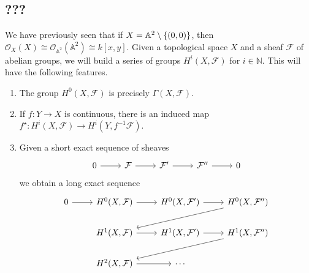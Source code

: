 \subsection{???}
We have previously seen that if \( X = \mathbb A^2 \setminus \qty{(0, 0)} \), then \( \mathcal O_X(X) \cong \mathcal O_{\mathbb A^2}(\mathbb A^2) \cong k[x, y] \).
Given a topological space \( X \) and a sheaf \( \mathcal F \) of abelian groups, we will build a series of groups \( H^i(X, \mathcal F) \) for \( i \in \mathbb N \).
This will have the following features.
\begin{enumerate}
    \item The group \( H^0(X, \mathcal F) \) is precisely \( \Gamma(X, \mathcal F) \).
    \item If \( f : Y \to X \) is continuous, there is an induced map \( f^\star : H^i(X, \mathcal F) \to H^i(Y, f^{-1} \mathcal F) \).
    \item Given a short exact sequence of sheaves
\[\begin{tikzcd}
	0 & {\mathcal F} & {\mathcal F'} & {\mathcal F''} & 0
	\arrow[from=1-1, to=1-2]
	\arrow[from=1-2, to=1-3]
	\arrow[from=1-3, to=1-4]
	\arrow[from=1-4, to=1-5]
\end{tikzcd}\]
    we obtain a long exact sequence
\[\begin{tikzcd}
	0 & {H^0(X, \mathcal F)} & {H^0(X, \mathcal F')} & {H^0(X, \mathcal F'')} \\
	& {H^1(X, \mathcal F)} & {H^1(X, \mathcal F')} & {H^1(X, \mathcal F'')} \\
	& {H^2(X, \mathcal F)} & \cdots
	\arrow[from=1-1, to=1-2]
	\arrow[from=1-2, to=1-3]
	\arrow[from=1-3, to=1-4]
	\arrow[from=1-4, to=2-2]
	\arrow[from=2-2, to=2-3]
	\arrow[from=2-3, to=2-4]
	\arrow[from=2-4, to=3-2]
	\arrow[from=3-2, to=3-3]
\end{tikzcd}\]
\end{enumerate}
